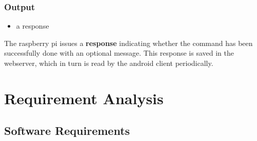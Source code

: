 \documentclass[12pt, oneside, a4paper]{book}
\begin{document}
				\subsubsection{Output}
				\begin{itemize}
					\item a response
				\end{itemize}
				The raspberry pi issues a \textbf{response} indicating whether the command has been successfully done with an optional message. This response is saved in the webserver, which in turn is read by the android client periodically.  
			
		\newpage\section{Requirement Analysis}
			\subsection{Software Requirements}
			\label{sec:software_req}
\end{document}

